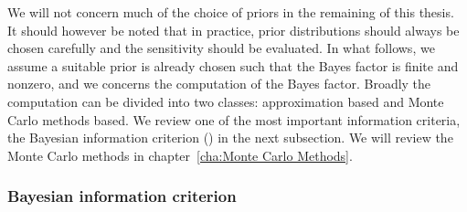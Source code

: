 We will not concern much of the choice of priors in the remaining of this
thesis. It should however be noted that in practice, prior distributions
should always be chosen carefully and the sensitivity should be evaluated. In
what follows, we assume a suitable prior is already chosen such that the Bayes
factor is finite and nonzero, and we concerns the computation of the Bayes
factor. Broadly the computation can be divided into two classes: approximation
based and Monte Carlo methods based. We review one of the most important
information criteria, the Bayesian information criterion (\bic) in the next
subsection. We will review the Monte Carlo methods in chapter~\ref{cha:Monte
  Carlo Methods}.

\subsubsection{Bayesian information criterion}
\label{ssub:Bayesian information criterion}

